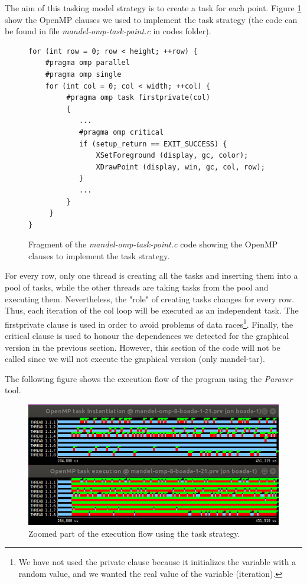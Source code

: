 \documentclass[12pt, a4paper]{article}
\begin{document}
The aim of this tasking model strategy is to create a task for each point. Figure \ref{code:task_implementation_point} show the OpenMP clauses we used to implement the task strategy (the code can be found in file \textit{mandel-omp-task-point.c} in codes folder).

\begin{figure}[H]
\begin{lstlisting}
for (int row = 0; row < height; ++row) {
	#pragma omp parallel
	#pragma omp single
    for (int col = 0; col < width; ++col) {
         #pragma omp task firstprivate(col)
         {
			...
			#pragma omp critical
	        if (setup_return == EXIT_SUCCESS) {
	        	XSetForeground (display, gc, color);
	        	XDrawPoint (display, win, gc, col, row);
	        }
			...
         }
     }
}
\end{lstlisting}
\caption{Fragment of the \textit{mandel-omp-task-point.c} code showing the OpenMP clauses to implement the task strategy.}
\label{code:task_implementation_point}
\end{figure}

For every row, only one thread is creating all the tasks and inserting them into a pool of tasks, while the other threads are taking tasks from the pool and executing them. Nevertheless, the "role" of creating tasks changes for every row. Thus, each iteration of the col loop will be executed as an independent task. The firstprivate clause is used in order to avoid problems of data races\footnote{We have not used the private clause because it initializes the variable with a random value, and we wanted the real value of the variable (iteration).}. Finally, the critical clause is used to honour the dependences we detected for the graphical version in the previous section. However, this section of the code will not be called since we will not execute the graphical version (only mandel-tar).

The following figure shows the execution flow of the program using the \textit{Paraver} tool.

\begin{figure}[H]
	\centering
	\includegraphics[scale=0.40]{./S2_OMP_tasks}
	\caption{Zoomed part of the execution flow using the task strategy.}
	\label{fig:S2_OMP_tasks}
\end{figure}
\end{document}
